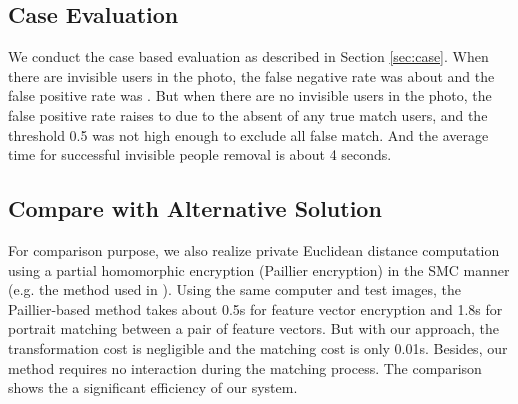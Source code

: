 \vspace{-0.05in}
\subsection{Case Evaluation}
\vspace{-0.05in}
We conduct the case based evaluation as
described in Section \ref{sec:case}.
When there are invisible users in the photo,
 the false negative rate was about  and the false positive rate was .
But when there are no invisible users in the photo,
 the false positive rate raises to  due to the absent of any true match users,
 and the threshold 0.5 was not high enough to exclude all false match.
And the average time for successful invisible people removal is about 4 seconds.

\vspace{-0.05in}
\subsection{Compare with Alternative Solution}
\vspace{-0.05in}
For comparison purpose, we also realize private Euclidean distance computation
 using a partial homomorphic encryption (Paillier encryption)
 in the SMC manner (e.g. the method used in \cite{katz2008predicate}).
Using the same computer and test images, the Paillier-based method takes about 0.5s for feature vector encryption
 and 1.8s for portrait matching between a pair of feature vectors.
But with our approach, the transformation cost is negligible and the matching cost is only 0.01s.
Besides, our method requires no interaction during the matching process.
The comparison shows the a significant efficiency of our system.
